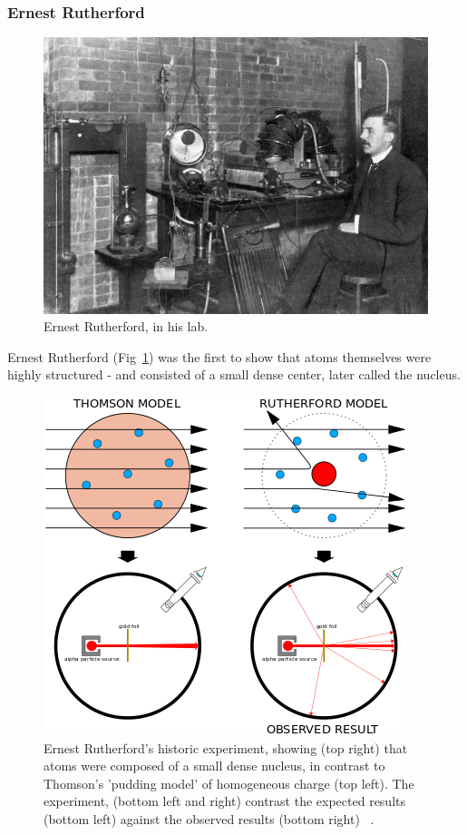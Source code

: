 \subsubsection{Ernest Rutherford}

\begin{figure}[ht]
	\centering
	\includegraphics[width=0.6\linewidth]{../Chapter2/fig/ernestrutherford.jpg}
	\caption{Ernest Rutherford, in his lab. ~\cite{Eve1939}}
	\label{fig:rutherford}
\end{figure}

Ernest Rutherford (Fig~\ref{fig:rutherford}) was the first to show that atoms
themselves were highly structured - and consisted of a small dense center, later
called the nucleus.

\begin{figure}[ht]
	\centering
	\includegraphics[width=0.6\linewidth]{../Chapter2/fig/geiger_marsden.png}
	\caption{
		Ernest Rutherford's historic experiment, showing (top right) that atoms were
		composed of a small dense nucleus, in contrast to Thomson's 'pudding model'
		of homogeneous charge (top left). The experiment, (bottom left and right)
		contrast the expected results (bottom left) against the observed results
		(bottom right) ~\cite{Kurzon2014}.
	}
	\label{fig:geigermarsden}
\end{figure}

